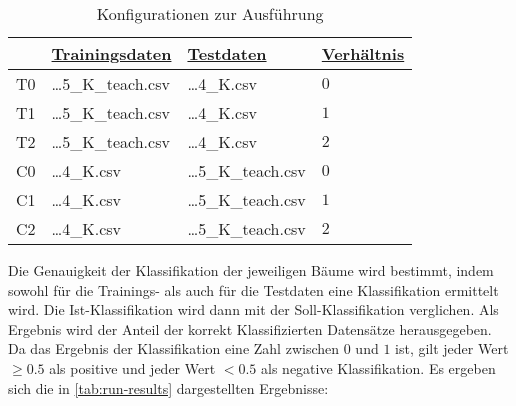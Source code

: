 \useunder{\uline}{\ul}{}
\begin{table}[h]
    \begin{center}
        \begin{tabular}{|l|l|l|l|}
        \hline
                               & {\ul \textbf{Trainingsdaten}} & {\ul \textbf{Testdaten}}      & {\ul \textbf{Verhältnis}} \\
            \hline
            T0                  & \dots 5\_K\_teach.csv & \dots 4\_K.csv        & $0$ \\
            \hline
            T1                  & \dots 5\_K\_teach.csv & \dots 4\_K.csv        & $1$ \\
            \hline
            T2                  & \dots 5\_K\_teach.csv & \dots 4\_K.csv        & $2$ \\
            \hline
            \hline
            C0                  & \dots 4\_K.csv        & \dots 5\_K\_teach.csv & $0$ \\
            \hline
            C1                  & \dots 4\_K.csv        & \dots 5\_K\_teach.csv & $1$ \\
            \hline
            C2                  & \dots 4\_K.csv        & \dots 5\_K\_teach.csv & $2$ \\
            \hline
        \end{tabular}
        \caption{Konfigurationen zur Ausführung}
        \label{tab:run-config}
    \end{center}
\end{table}

Die Genauigkeit der Klassifikation der jeweiligen Bäume wird bestimmt,
indem sowohl für die Trainings- als auch für die Testdaten eine Klassifikation ermittelt wird.
Die Ist-Klassifikation wird dann mit der Soll-Klassifikation verglichen.
Als Ergebnis wird der Anteil der korrekt Klassifizierten Datensätze herausgegeben.
Da das Ergebnis der Klassifikation eine Zahl zwischen $0$ und $1$ ist,
gilt jeder Wert $\geq 0.5$ als positive und jeder Wert $< 0.5$ als negative Klassifikation.
Es ergeben sich die in \autoref{tab:run-results} dargestellten Ergebnisse:

